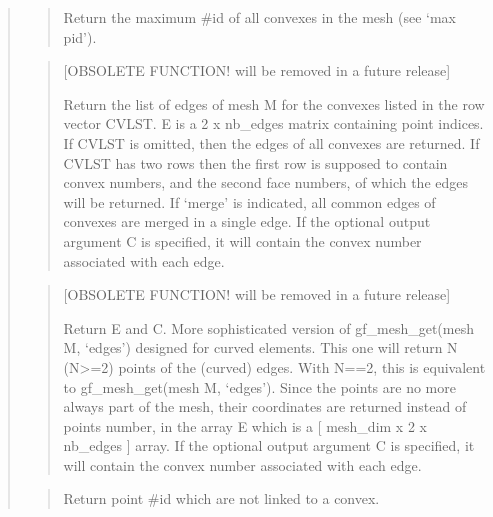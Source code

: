 \documentclass[a4paper,11pt,english]{sphinxmanual}
\begin{document}
\begin{quote}
\begin{quote}
\sphinxAtStartPar
Return the maximum \#id of all convexes in the mesh (see ‘max pid’).
\end{quote}

\sphinxAtStartPar
{}
\begin{quote}

\sphinxAtStartPar
{[}OBSOLETE FUNCTION! will be removed in a future release{]}

\sphinxAtStartPar
Return the list of edges of mesh M for the convexes listed in the
row vector CVLST. E is a 2 x nb\_edges matrix containing point
indices. If CVLST is omitted, then the edges of all convexes are
returned. If CVLST has two rows then the first row is supposed to
contain convex numbers, and the second face numbers, of which the
edges will be returned.  If ‘merge’ is indicated, all common
edges of convexes are merged in a single edge.  If the optional
output argument C is specified, it will contain the convex number
associated with each edge.
\end{quote}

\sphinxAtStartPar
{}
\begin{quote}

\sphinxAtStartPar
{[}OBSOLETE FUNCTION! will be removed in a future release{]}

\sphinxAtStartPar
Return E and C.
More sophisticated version of gf\_mesh\_get(mesh M, ‘edges’) designed for
curved elements. This one will return N (N\textgreater{}=2) points of the
(curved) edges. With N==2, this is equivalent to
gf\_mesh\_get(mesh M, ‘edges’). Since the points are no more always part of
the mesh, their coordinates are returned instead of points
number, in the array E which is a {[} mesh\_dim x 2 x nb\_edges {]}
array.  If the optional output argument C is specified, it will
contain the convex number associated with each edge.
\end{quote}

\sphinxAtStartPar
{}
\begin{quote}

\sphinxAtStartPar
Return point \#id which are not linked to a convex.
\end{quote}


\end{quote}
\end{document}
